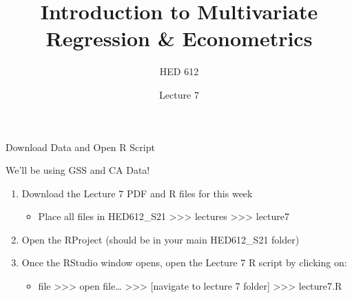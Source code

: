 \documentclass[
  8pt,
  ignorenonframetext,
  dvipsnames]{beamer}
\title{Introduction to Multivariate Regression \& Econometrics}
\subtitle{HED 612}
\author{Lecture 7}
\date{}
\providecommand{\tightlist}{%
  \setlength{\itemsep}{0pt}\setlength{\parskip}{0pt}}
\let\olditem\item
\renewcommand{\item}{%
  \olditem\vspace{4pt}
}
\begin{document}
\frame{\titlepage}

\begin{frame}
  \tableofcontents[hideallsubsections]
\end{frame}
\begin{frame}{Download Data and Open R Script}
\protect\hypertarget{download-data-and-open-r-script}{}

We'll be using GSS and CA Data!

\medskip

\begin{enumerate}
\tightlist
\item
  Download the Lecture 7 PDF and R files for this week

  \begin{itemize}
  \tightlist
  \item
    Place all files in HED612\_S21
    \textgreater\textgreater\textgreater{} lectures
    \textgreater\textgreater\textgreater{} lecture7
  \end{itemize}
\item
  Open the RProject (should be in your main HED612\_S21 folder)
\item
  Once the RStudio window opens, open the Lecture 7 R script by clicking
  on:

  \begin{itemize}
  \tightlist
  \item
    file \textgreater\textgreater\textgreater{} open file\ldots{}
    \textgreater\textgreater\textgreater{} {[}navigate to lecture 7
    folder{]} \textgreater\textgreater\textgreater{} lecture7.R
  \end{itemize}
\end{enumerate}

\end{frame}
\end{document}
